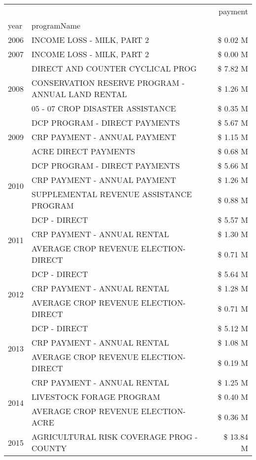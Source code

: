 \begin{tabular}{llr}
\toprule
 &  & payment \\
year & programName &  \\
\midrule
2006 & INCOME LOSS - MILK, PART 2 & \$ 0.02 M \\
\cline{1-3}
2007 & INCOME LOSS - MILK, PART 2 & \$ 0.00 M \\
\cline{1-3}
\multirow[t]{3}{*}{2008} & DIRECT AND COUNTER CYCLICAL PROG & \$ 7.82 M \\
 & CONSERVATION RESERVE PROGRAM - ANNUAL LAND RENTAL & \$ 1.26 M \\
 & 05 - 07 CROP DISASTER ASSISTANCE & \$ 0.35 M \\
\cline{1-3}
\multirow[t]{3}{*}{2009} & DCP PROGRAM - DIRECT PAYMENTS & \$ 5.67 M \\
 & CRP PAYMENT - ANNUAL PAYMENT & \$ 1.15 M \\
 & ACRE DIRECT PAYMENTS & \$ 0.68 M \\
\cline{1-3}
\multirow[t]{3}{*}{2010} & DCP PROGRAM - DIRECT PAYMENTS & \$ 5.66 M \\
 & CRP PAYMENT - ANNUAL PAYMENT & \$ 1.26 M \\
 & SUPPLEMENTAL REVENUE ASSISTANCE PROGRAM & \$ 0.88 M \\
\cline{1-3}
\multirow[t]{3}{*}{2011} & DCP - DIRECT & \$ 5.57 M \\
 & CRP PAYMENT - ANNUAL RENTAL & \$ 1.30 M \\
 & AVERAGE CROP REVENUE ELECTION-DIRECT & \$ 0.71 M \\
\cline{1-3}
\multirow[t]{3}{*}{2012} & DCP - DIRECT & \$ 5.64 M \\
 & CRP PAYMENT - ANNUAL RENTAL & \$ 1.28 M \\
 & AVERAGE CROP REVENUE ELECTION-DIRECT & \$ 0.71 M \\
\cline{1-3}
\multirow[t]{3}{*}{2013} & DCP - DIRECT & \$ 5.12 M \\
 & CRP PAYMENT - ANNUAL RENTAL & \$ 1.08 M \\
 & AVERAGE CROP REVENUE ELECTION-DIRECT & \$ 0.19 M \\
\cline{1-3}
\multirow[t]{3}{*}{2014} & CRP PAYMENT - ANNUAL RENTAL & \$ 1.25 M \\
 & LIVESTOCK FORAGE PROGRAM & \$ 0.40 M \\
 & AVERAGE CROP REVENUE ELECTION-ACRE & \$ 0.36 M \\
\cline{1-3}
\multirow[t]{3}{*}{2015} & AGRICULTURAL RISK COVERAGE PROG - COUNTY & \$ 13.84 M \\

\end{tabular}
